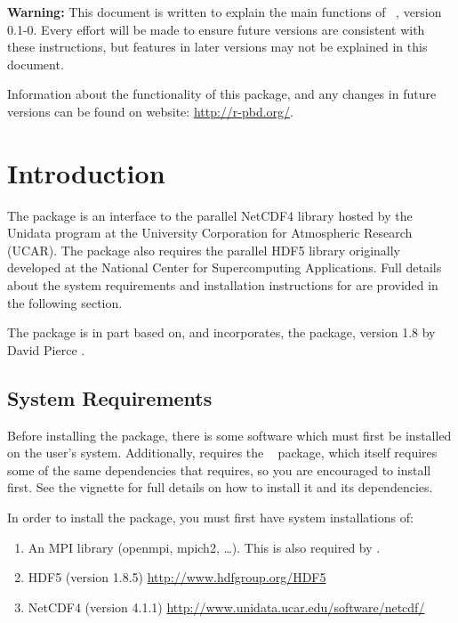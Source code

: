 {\color{red} \bf Warning:} This document is written to explain the main
functions of ~\citep{Ostrouchov2012pbdNCDF4package},
version 0.1-0.
Every effort will be made to ensure future versions are consistent with
these instructions, but features in later versions may not be explained
in this document.

Information about the functionality of this package,
and any changes in future versions can be found on website:
\url{http://r-pbd.org/}.

\section{Introduction}
\label{sec:quick_start}

The  package is an interface to the parallel NetCDF4 library \citep{netcdf} hosted by the Unidata program at the University Corporation for Atmospheric Research (UCAR). The package also requires the parallel HDF5 library \citep{hdf5} originally developed at the National Center for Supercomputing Applications. Full details about the system requirements and installation instructions for  are provided in the following section.

The  package is in part based on, and incorporates, the  package, version 1.8 by David Pierce \citep{ncdf4}.  

\subsection[System Requirements]{System Requirements}
\label{sec:system_requirements}

Before installing the  package, there is some software which must first be installed on the user's system.  Additionally,  requires the ~\citep{Chen2012pbdMPIpackage} package, which itself requires some of the same dependencies that  requires, so you are encouraged to install  first.  See the  vignette \citep{Chen2012pbdMPIvignette} for full details on how to install it and its dependencies.

In order to install the  package, you must first have system installations of:
\begin{enumerate}
  \item An MPI library (openmpi, mpich2, \dots).  This is also required by .
  \item HDF5 (version 1.8.5) \url{http://www.hdfgroup.org/HDF5}
  \item NetCDF4 (version 4.1.1) \url{http://www.unidata.ucar.edu/software/netcdf/}
\end{enumerate}

